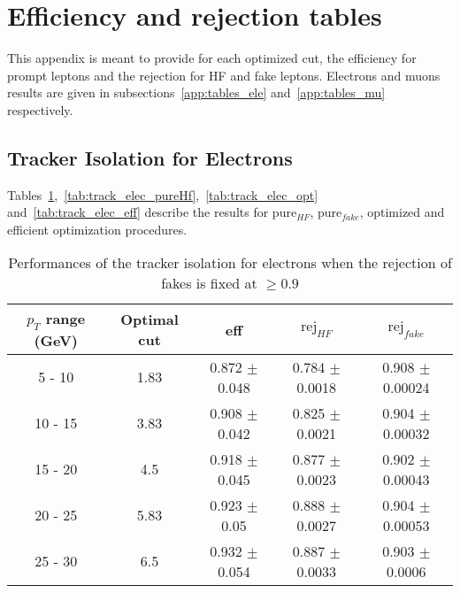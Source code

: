 \section{Efficiency and rejection tables}
\label{app:tables}
This appendix is meant to provide for each optimized cut,
the efficiency for prompt leptons and the rejection  for HF and fake leptons.
Electrons and muons results are given in subsections~\ref{app:tables_ele} and~\ref{app:tables_mu} respectively.
\subsection{Tracker Isolation for Electrons}
Tables~\ref{tab:track_elec_pureFake},~\ref{tab:track_elec_pureHf},~\ref{tab:track_elec_opt} and~\ref{tab:track_elec_eff}
describe the results for pure$_{HF}$, pure$_{fake}$, optimized and efficient optimization procedures.
\label{app:tables_ele}



\begin{table}[htbp]
   \centering
   \begin{tabular}{|c|c|c|c|c|}
      \hline
      $p_T$ range (GeV) & Optimal cut & eff & $\textrm{rej}_{HF}$ & $\textrm{rej}_{fake}$ \\
      \hline
      5 - 10 & 1.83 & 0.872 $\pm$ 0.048 & 0.784 $\pm$ 0.0018 & 0.908 $\pm$ 0.00024 \\
      \hline
      10 - 15 & 3.83 & 0.908 $\pm$ 0.042 & 0.825 $\pm$ 0.0021 & 0.904 $\pm$ 0.00032 \\
      \hline
      15 - 20 & 4.5 & 0.918 $\pm$ 0.045 & 0.877 $\pm$ 0.0023 & 0.902 $\pm$ 0.00043 \\
      \hline
      20 - 25 & 5.83 & 0.923 $\pm$ 0.05 & 0.888 $\pm$ 0.0027 & 0.904 $\pm$ 0.00053 \\
      \hline
      25 - 30 & 6.5 & 0.932 $\pm$ 0.054 & 0.887 $\pm$ 0.0033 & 0.903 $\pm$ 0.0006 \\
      \hline
   \end{tabular}
   \caption{\small{Performances of the tracker isolation for electrons when the rejection of fakes is fixed at $\geq 0.9$}\label{tab:track_elec_pureFake}}
\end{table}






